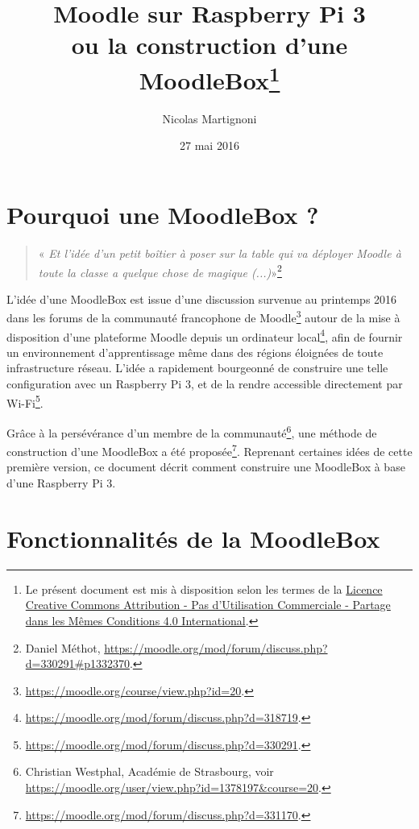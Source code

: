 \documentclass[11pt]{article}
\begin{document}
\title{Moodle sur Raspberry Pi 3\\ ou la construction d'une MoodleBox\footnote{Le présent document est mis à disposition selon les termes de la \href{http://creativecommons.org/licenses/by-nc-sa/4.0/}{Licence Creative Commons Attribution - Pas d'Utilisation Commerciale - Partage dans les Mêmes Conditions 4.0 International}.}}
\date{27 mai 2016}
\author{Nicolas Martignoni}
\maketitle

\begingroup
\setlength{\parskip}{0pt}
\tableofcontents
\endgroup

\section{Pourquoi une MoodleBox ?}

\begin{quote}
\noindent « \emph{Et l'idée d'un petit boîtier à poser sur la table qui va déployer Moodle à toute la classe a quelque chose de magique (...)}»\footnote{Daniel Méthot, \url{https://moodle.org/mod/forum/discuss.php?d=330291\#p1332370}.}
\end{quote}

L'idée d'une MoodleBox est issue d'une discussion survenue au printemps 2016 dans les forums de la communauté francophone de Moodle\footnote{\url{https://moodle.org/course/view.php?id=20}.} autour de la mise à disposition d'une plateforme Moodle depuis un ordinateur local\footnote{\url{https://moodle.org/mod/forum/discuss.php?d=318719}.}, afin de fournir un environnement d'apprentissage même dans des régions éloignées de toute infrastructure réseau. L'idée a rapidement bourgeonné de construire une telle configuration avec un Raspberry Pi 3, et de la rendre accessible directement par Wi-Fi\footnote{\url{https://moodle.org/mod/forum/discuss.php?d=330291}.}.

Grâce à la persévérance d'un membre de la communauté\footnote{Christian Westphal, Académie de Strasbourg, voir \url{https://moodle.org/user/view.php?id=1378197&course=20}.}, une méthode de construction d'une MoodleBox a été proposée\footnote{\url{https://moodle.org/mod/forum/discuss.php?d=331170}.}. Reprenant certaines idées de cette première version, ce document décrit comment construire une MoodleBox à base d'une Raspberry Pi 3.

\section{Fonctionnalités de la MoodleBox}
\end{document}
